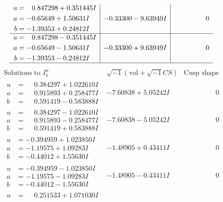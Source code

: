 \documentclass[1p]{elsarticle_modified}
\theoremstyle{definition}
\newcommand{\I}{\sqrt{-1}}
\begin{document}
$$\begin{array}{c|c|c}
\begin{aligned}
u &= \phantom{-}0.847298 + 0.351445 I \\
a &= -0.65649 + 1.50631 I \\
b &= -1.39353 + 0.24812 I\end{aligned}
 & -0.33300 - 9.63949 I & \phantom{-0.000000 } 0 \\ \hline\begin{aligned}
u &= \phantom{-}0.847298 - 0.351445 I \\
a &= -0.65649 - 1.50631 I \\
b &= -1.39353 - 0.24812 I\end{aligned}
 & -0.33300 + 9.63949 I & \phantom{-0.000000 } 0\\
 \hline 
 \end{array}$$\newpage$$\begin{array}{c|c|c}  
\text{Solutions to }I^u_{1}& \I (\text{vol} + \sqrt{-1}CS) & \text{Cusp shape}\\
 \hline 
\begin{aligned}
u &= \phantom{-}0.384297 + 1.022610 I \\
a &= \phantom{-}0.915893 + 0.258477 I \\
b &= \phantom{-}0.591419 - 0.583888 I\end{aligned}
 & -7.60838 + 5.05242 I & \phantom{-0.000000 } 0 \\ \hline\begin{aligned}
u &= \phantom{-}0.384297 - 1.022610 I \\
a &= \phantom{-}0.915893 - 0.258477 I \\
b &= \phantom{-}0.591419 + 0.583888 I\end{aligned}
 & -7.60838 - 5.05242 I & \phantom{-0.000000 } 0 \\ \hline\begin{aligned}
u &= -0.394959 + 1.023850 I \\
a &= -1.19575 + 1.09283 I \\
b &= -0.44012 + 1.55630 I\end{aligned}
 & -1.48905 + 0.43411 I & \phantom{-0.000000 } 0 \\ \hline\begin{aligned}
u &= -0.394959 - 1.023850 I \\
a &= -1.19575 - 1.09283 I \\
b &= -0.44012 - 1.55630 I\end{aligned}
 & -1.48905 - 0.43411 I & \phantom{-0.000000 } 0 \\ \hline\begin{aligned}
u &= \phantom{-}0.251533 + 1.071030 I \\

\end{aligned}
\end{array}$$
\end{document}
